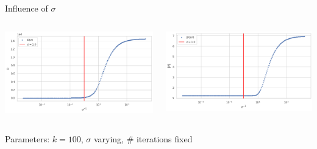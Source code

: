 \documentclass{beamer}
\begin{document}
\begin{frame}{Influence of $\sigma$}
	\begin{minipage}[0.95\textheight]{\textwidth}
	\begin{columns}[T]
	\begin{column}{0.50\textwidth}
	\includegraphics[width=\textwidth, keepaspectratio]{../images/D_sigma.png}
	\end{column}
	\begin{column}{0.50\textwidth}
	\includegraphics[width=\textwidth, keepaspectratio]{../images/v_sigma.png}
	\end{column}
	\end{columns}
	\end{minipage}
	\begin{center}
		Parameters: $k=100$, $\sigma$ varying, \# iterations fixed
	\end{center}
\end{frame}
\end{document}
